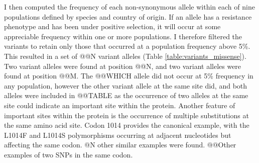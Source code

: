 \documentclass[a4paper,11pt,abstracton,hidelinks]{scrartcl}
\begin{document}
%
I then computed the frequency of each non-synonymous allele within each of nine populations defined by species and country of origin.
%
If an allele has a resistance phenotype and has been under positive selection, it will occur at some appreciable frequency within one or more populations.
%
I therefore filtered the variants to retain only those that occurred at a population frequency above 5\%.
%
This resulted in a set of @@N variant alleles (Table \ref{table:variants_missense}).
%
Two variant alleles were found at position @@N, and two variant alleles were found at position @@M.
%
The @@WHICH allele did not occur at 5\% frequency in any population, however the other variant allele at the same site did, and both alleles were included in @@TABLE as the occurrence of two alleles at the same site could indicate an important site within the protein.
%
Another feature of important sites within the protein is the occurrence of multiple substitutions at the same amino acid site.
%
Codon 1014 provides the canonical example, with the L1014F and L1014S polymorphisms occurring at adjacent nucleotides but affecting the same codon.
%
@N other similar examples were found.
%
@@Other examples of two SNPs in the same codon.
\end{document}
